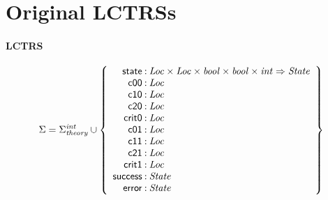 \documentclass[a4paper]{article}
\newcommand{\Sort}[1]{\mathit{#1}}
\newcommand{\symb}[1]{\mathsf{#1}}
\newcommand{\Sigmainttheory}{\Sigma^{\mathit{int}}_{\mathit{theory}}}
\begin{document}

\section*{Original LCTRSs}

\paragraph{LCTRS}

\[
\Sigma = 
\Sigmainttheory \cup\left\{
\begin{array}{r@{\>}c@{\>}l}
\symb{state} & : & \Sort{Loc} \times \Sort{Loc} \times \Sort{bool} \times \Sort{bool} \times \Sort{int} \Rightarrow \Sort{State}\\
\symb{c00} & : & \Sort{Loc}\\
\symb{c10} & : & \Sort{Loc}\\
\symb{c20} & : & \Sort{Loc}\\
\symb{crit0} & : & \Sort{Loc}\\
\symb{c01} & : & \Sort{Loc}\\
\symb{c11} & : & \Sort{Loc}\\
\symb{c21} & : & \Sort{Loc}\\
\symb{crit1} & : & \Sort{Loc}\\
\symb{success} & : & \Sort{State}\\
\symb{error} & : & \Sort{State}\\
\end{array}
\right\}
\]
\end{document}
